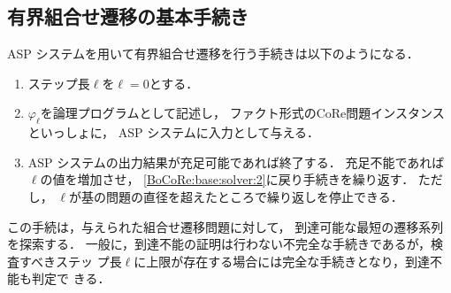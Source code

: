\subsection{有界組合せ遷移の基本手続き} \label{sec:based_solver}

ASP システムを用いて有界組合せ遷移を行う手続きは以下のようになる．
\begin{enumerate}
\item ステップ長$\ell$を$\ell=0$とする．
\item \label{BoCoRe:base:solver:2}
  $\varphi_\ell$を論理プログラムとして記述し，
  ファクト形式のCoRe問題インスタンスといっしょに，
  ASP システムに入力として与える．
\item ASP システムの出力結果が充足可能であれば終了する．
  充足不能であれば$\ell$の値を増加させ，
  \ref{BoCoRe:base:solver:2}に戻り手続きを繰り返す．
  ただし，
  $\ell$が基の問題の直径を超えたところで繰り返しを停止できる．
\end{enumerate}
この手続は，与えられた組合せ遷移問題に対して，
到達可能な最短の遷移系列を探索する．
一般に，到達不能の証明は行わない不完全な手続きであるが，検査すべきステッ
プ長$\ell$に上限が存在する場合には完全な手続きとなり，到達不能も判定で
きる．







